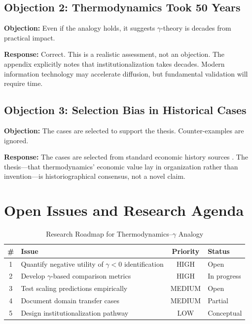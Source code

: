 \subsection{Objection 2: Thermodynamics Took 50 Years}

\textbf{Objection:} Even if the analogy holds, it suggests $\gamma$-theory
is decades from practical impact.

\textbf{Response:} Correct. This is a realistic assessment, not an objection.
The appendix explicitly notes that institutionalization takes decades.
Modern information technology may accelerate diffusion, but fundamental
validation will require time.

\subsection{Objection 3: Selection Bias in Historical Cases}

\textbf{Objection:} The cases are selected to support the thesis. Counter-examples
are ignored.

\textbf{Response:} The cases are selected from standard economic history
sources \citep{landes1969unbound, mokyr2002gifts, allen2009british}.
The thesis---that thermodynamics' economic value lay in organization rather
than invention---is historiographical consensus, not a novel claim.


\section{Open Issues and Research Agenda}
\label{sec:thermo-open}

\begin{table}[htbp]
\centering
\caption{Research Roadmap for Thermodynamics--$\gamma$ Analogy}
\label{tab:thermo-roadmap}
\renewcommand{\arraystretch}{1.3}
\begin{tabular}{@{}clcl@{}}
\toprule
\textbf{\#} & \textbf{Issue} & \textbf{Priority} & \textbf{Status} \\
\midrule
1 & Quantify negative utility of $\gamma < 0$ identification & HIGH & Open \\
2 & Develop $\gamma$-based comparison metrics & HIGH & In progress \\
3 & Test scaling predictions empirically & MEDIUM & Open \\
4 & Document domain transfer cases & MEDIUM & Partial \\
5 & Design institutionalization pathway & LOW & Conceptual \\
\bottomrule
\end{tabular}
\end{table}


